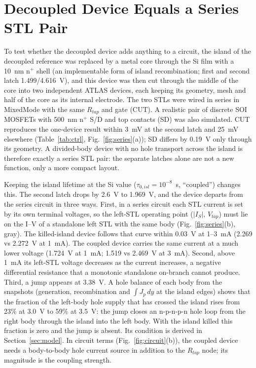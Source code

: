 \documentclass[journal]{IEEEtran}
\begin{document}
\section{Decoupled Device Equals a Series STL Pair}
To test whether the decoupled device adds anything to a circuit, the island of the decoupled reference was replaced by a metal core through the Si film with a 10~nm n$^+$ shell (an implementable form of island recombination; first and second latch 1.499/4.616~V), and this device was then cut through the middle of the core into two independent ATLAS devices, each keeping its geometry, mesh and half of the core as its internal electrode. The two STLs were wired in series in MixedMode with the same $R_{tap}$ and gate (CUT). A realistic pair of discrete SOI MOSFETs with 500~nm n$^+$ S/D and top contacts (SD) was also simulated. CUT reproduces the one-device result within 3~mV at the second latch and 25~mV elsewhere (Table~\ref{tab:ctrl}, Fig.~\ref{fig:series}(a)); SD differs by 0.19~V only through its geometry. A divided-body device with no hole transport across the island is therefore exactly a series STL pair: the separate latches alone are not a new function, only a more compact layout.

Keeping the island lifetime at the Si value ($\tau_{0,isl}=10^{-8}$~s, ``coupled'') changes this. The second latch drops by 2.6~V to 1.969~V, and the device departs from the series circuit in three ways. First, in a series circuit each STL current is set by its own terminal voltages, so the left-STL operating point ($|I_S|$, $V_{tap}$) must lie on the I--V of a standalone left STL with the same body (Fig.~\ref{fig:series}(b), gray). The killed-island device follows that curve within 0.03~V at 1--3~mA (2.269 vs 2.272~V at 1~mA). The coupled device carries the same current at a much lower voltage (1.724~V at 1~mA; 1.519 vs 2.469~V at 3~mA). Second, above 1~mA its left-STL voltage decreases as the current increases, a negative differential resistance that a monotonic standalone on-branch cannot produce. Third, a jump appears at 3.38~V. A hole balance of each body from the snapshots (generation, recombination and $\int J_p\,dy$ at the island edges) shows that the fraction of the left-body hole supply that has crossed the island rises from 23\% at 3.0~V to 59\% at 3.5~V: the jump closes an n-p-n-p-n hole loop from the right body through the island into the left body. With the island killed this fraction is zero and the jump is absent. Its condition is derived in Section~\ref{sec:model}. In circuit terms (Fig.~\ref{fig:circuit}(b)), the coupled device needs a body-to-body hole current source in addition to the $R_{tap}$ node; its magnitude is the coupling strength.
\end{document}
